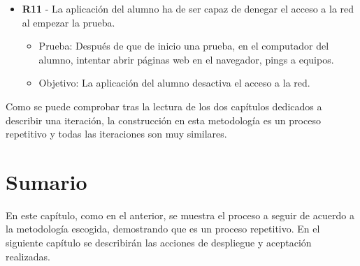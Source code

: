 \begin{itemize}
    \item {\bfseries R11} - La aplicación del alumno ha de ser capaz de denegar el acceso a la red al empezar la prueba.

    \begin{itemize}

        \item Prueba: Después de que de inicio una prueba, en el computador del alumno, intentar abrir páginas web en el navegador, pings a equipos.
        \item Objetivo: La aplicación del alumno desactiva el acceso a la red.
    \end{itemize}

\end{itemize}

Como se puede comprobar tras la lectura de los dos capítulos dedicados a describir una iteración, la construcción en esta metodología es un proceso repetitivo y todas las iteraciones son muy similares. 


\section{Sumario}

En este capítulo, como en el anterior, se muestra el proceso a seguir de acuerdo a la metodología escogida, demostrando que es un proceso repetitivo. En el siguiente capítulo se describirán las acciones de despliegue y aceptación realizadas. 